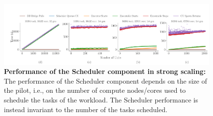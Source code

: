 \documentclass{article}
\begin{document}
\begin{figure}
  \centering
  \includegraphics[width=\textwidth]{figures/paper_titan_rp_synapse_strong_scaling_events_timeline_1stgen_horizontal.pdf}
  \caption{\textbf{Performance of the Scheduler component in strong scaling:}
	The performance of the Scheduler component depends on the size of the
	pilot, i.e., on the number of compute nodes/cores used to schedule the
	tasks of the workload. The Scheduler performance is instead invariant to
	the number of the tasks scheduled. }\label{fig:ss-events-1stgen}
\end{figure}
\end{document}
